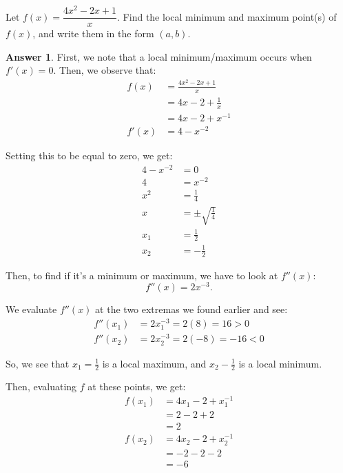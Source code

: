\documentclass[addpoints, 12pt]{exam}
\theoremstyle{definition}
\newtheorem*{answer}{Answer}
\begin{document}
\begin{questions}


\question[3] Let $f(x) = \dfrac{4x^2 - 2x + 1}{x}$. Find the local minimum and maximum point(s) of $f(x)$, and write them in the form $(a, b)$. 

\begin{shaded}
\begin{answer}

First, we note that a local minimum/maximum occurs when $f'(x) = 0$. Then, we observe that:
\begin{align*}
	f(x) &= \frac{4x^{2}-2x+1}{x} \\
	&= 4x - 2 + \frac{1}{x} \\
	&= 4x - 2 + x^{-1} \\
	f'(x) &= 4 -x^{-2}
\end{align*}

Setting this to be equal to zero, we get:
\begin{align*}
	4-x^{-2} &= 0 \\
	4 &= x^{-2} \\
	x^{2} &= \frac{1}{4} \\
	x &= \pm\sqrt{\frac{1}{4}} \\
	x_{1} &= \frac{1}{2} \\
	x_{2} &= -\frac{1}{2}
\end{align*}

Then, to find if it's a minimum or maximum, we have to look at $f''(x)$:
\begin{equation*}
	f''(x) = 2x^{-3}.
\end{equation*}

We evaluate $f''(x)$ at the two extremas we found earlier and see:
\begin{align*}
	f''(x_{1}) &= 2x_{1}^{-3} = 2(8) = 16 > 0\\
	f''(x_{2}) &= 2x_{2}^{-3} = 2(-8) = -16 < 0
\end{align*}

So, we see that $x_{1} = \frac{1}{2}$ is a local maximum, and $x_{2} -\frac{1}{2}$ is a local minimum.

Then, evaluating $f$ at these points, we get:
\begin{align*}
	f(x_{1}) &= 4x_{1} -2 + x_{1}^{-1} \\
	&= 2 - 2 + 2 \\
	&= 2 \\
	f(x_{2}) &= 4x_{2} - 2 + x_{2}^{-1} \\
	&= -2 - 2 - 2 \\
	&= -6
\end{align*}


\end{answer}
\end{shaded}
\end{questions}
\end{document}
